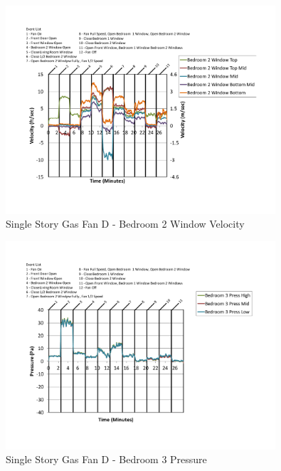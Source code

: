 \documentclass{article}
\begin{document}
\begin{appendices}
	\begin{figure}[H]
		\centering
		\includegraphics[height=3.05in,trim=0.67in 1.1in 0.67in 0.8in,clip=true]{0_Images/Results_Charts/ColdFlow/Single_Story/Gas/D/Bedroom_2_Window_Velocity.pdf}
		\caption{Single Story Gas Fan D - Bedroom 2 Window Velocity}
	\end{figure}
 

	\begin{figure}[H]
		\centering
		\includegraphics[height=3.05in,trim=0.67in 1.1in 0.67in 0.8in,clip=true]{0_Images/Results_Charts/ColdFlow/Single_Story/Gas/D/Bedroom_3_Pressure.pdf}
		\caption{Single Story Gas Fan D - Bedroom 3 Pressure}
	\end{figure}
 
	\clearpage


\end{appendices}
\end{document}
